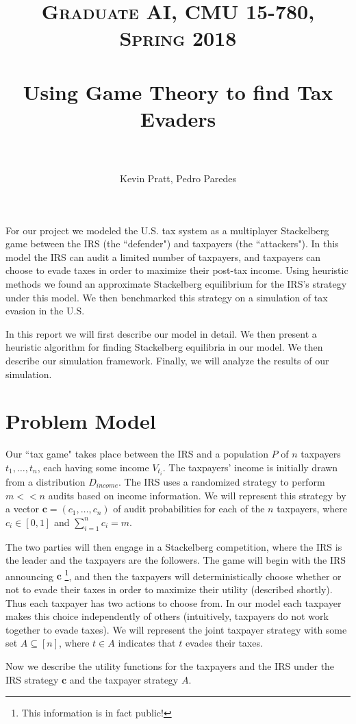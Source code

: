 \documentclass[paper=letter, fontsize=11pt]{article}
\title{
  \normalfont \normalsize
  \textsc{Graduate AI, CMU 15-780, Spring 2018} \\ [25pt]
  \horrule{0.5pt} \\[0.4cm]
  \huge Using Game Theory to find Tax Evaders \\
  \horrule{2pt} \\[0.5cm]
}
\author{Kevin Pratt, Pedro Paredes}
\date{}
\begin{document}
\maketitle
\thispagestyle{firstpage}

For our project we modeled the U.S. tax system as a multiplayer
Stackelberg game between the IRS (the ``defender") and taxpayers (the
``attackers"). In this model the IRS can audit a limited number of
taxpayers, and taxpayers can choose to evade taxes in order to
maximize their post-tax income. Using heuristic methods we found an
approximate Stackelberg equilibrium for the IRS's strategy under this
model. We then benchmarked this strategy on a simulation of tax
evasion in the U.S.

In this report we will first describe our model in detail. We then
present a heuristic algorithm for finding Stackelberg equilibria in
our model. We then describe our simulation framework. Finally, we will
analyze the results of our simulation.

\section*{Problem Model}

Our ``tax game" takes place between the IRS and a population $P$ of
$n$ taxpayers $t_1, \ldots, t_n$, each having some income
$V_{t_i}$. The taxpayers' income is initially drawn from a
distribution $D_{income}$. The IRS uses a randomized strategy to
perform $m << n$ audits based on income information. We will represent
this strategy by a vector $\bm{c} = (c_1, \ldots, c_n)$ of audit
probabilities for each of the $n$ taxpayers, where $c_i \in [0,1]$ and
$\sum_{i = 1}^n c_i = m$.

The two parties will then engage in a Stackelberg competition, where
the IRS is the leader and the taxpayers are the followers. The game
will begin with the IRS announcing $\bm{c}$ \footnote{This information
  is in fact public!}, and then the taxpayers will deterministically
choose whether or not to evade their taxes in order to maximize their
utility (described shortly). Thus each taxpayer has two actions to
choose from. In our model each taxpayer makes this choice
independently of others (intuitively, taxpayers do not work together
to evade taxes). We will represent the joint taxpayer strategy with
some set $A \subseteq [n]$, where $t \in A$ indicates that $t$ evades
their taxes.

Now we describe the utility functions for the taxpayers and the IRS
under the IRS strategy $\bm{c}$ and the taxpayer strategy $A$.
\end{document}
